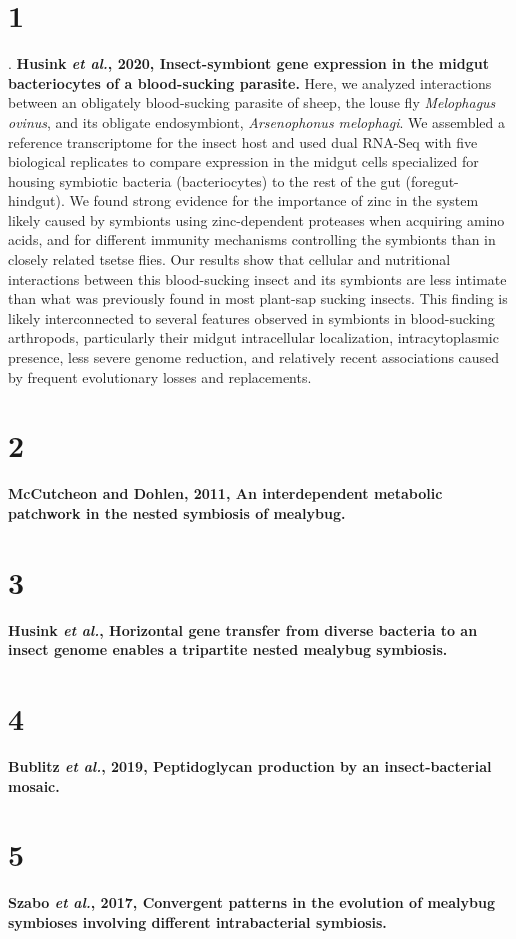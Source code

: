 \documentclass[11pt]{article}
\begin{document}
\begin{sloppypar}
\section*{1}. 
\textbf{Husink \textit{et al.}, 2020, Insect-symbiont gene expression in the midgut bacteriocytes of a blood-sucking parasite.}
Here, we analyzed interactions between an obligately blood-sucking parasite of sheep, the louse fly \textit{Melophagus ovinus}, and its obligate endosymbiont, \textit{Arsenophonus melophagi}. 
We assembled a reference transcriptome for the insect host and used dual RNA-Seq with five biological replicates to compare expression in the midgut cells specialized for housing symbiotic bacteria (bacteriocytes) to the rest of the gut (foregut-hindgut). 
We found strong evidence for the importance of zinc in the system likely caused by symbionts using zinc-dependent proteases when acquiring amino acids, and for different immunity mechanisms controlling the symbionts than in closely related tsetse flies. Our results show that cellular and nutritional interactions between this blood-sucking insect and its symbionts are less intimate than what was previously found in most plant-sap sucking insects. This finding is likely interconnected to several features observed in symbionts in blood-sucking arthropods, particularly their midgut intracellular localization, intracytoplasmic presence, less severe genome reduction, and relatively recent associations caused by frequent evolutionary losses and replacements. 

\section*{2}
\textbf{McCutcheon and Dohlen, 2011, An interdependent metabolic patchwork in the nested symbiosis of mealybug.}

\section*{3}
\textbf{Husink \textit{et al.}, Horizontal gene transfer from diverse bacteria to an insect genome enables a tripartite nested mealybug symbiosis.}

\section*{4}
\textbf{Bublitz \textit{et al.}, 2019, Peptidoglycan production by an insect-bacterial mosaic.}

\section*{5}
\textbf{Szabo \textit{et al.}, 2017, Convergent patterns in the evolution of mealybug symbioses involving different intrabacterial symbiosis.}


\end{sloppypar}
\end{document}

